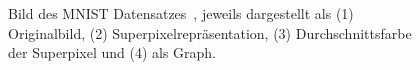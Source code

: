 \begin{figure}[t]
\centering
{}
  \caption[\gls{MNIST}]{Bild des \gls{MNIST} Datensatzes~\cite{mnist}, jeweils dargestellt als (1) Originalbild, (2) Superpixelrepräsentation, (3) Durchschnittsfarbe der Superpixel und (4) als Graph.}
\label{fig:mnist}
\end{figure}
